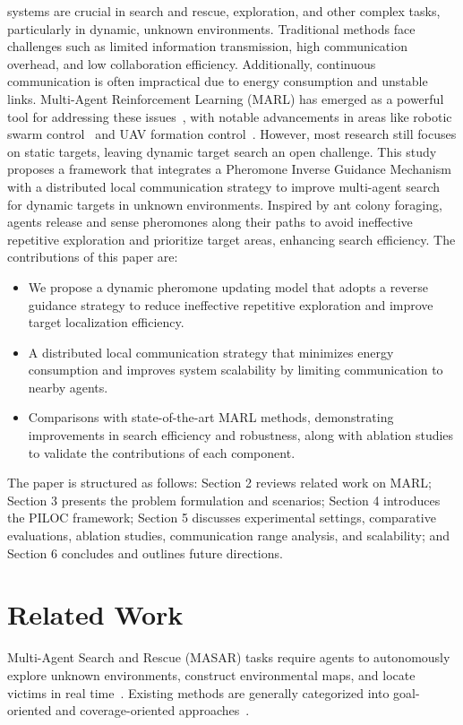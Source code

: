 \documentclass[lettersize,journal]{IEEEtran}
\begin{document}
 systems are crucial in search and rescue, exploration, and other complex tasks, particularly in dynamic, unknown environments. Traditional methods face challenges such as limited information transmission, high communication overhead, and low collaboration efficiency. Additionally, continuous communication is often impractical due to energy consumption and unstable links. Multi-Agent Reinforcement Learning (MARL) has emerged as a powerful tool for addressing these issues~\cite{bahrpeyma2022review,agrawal2021multi}, with notable advancements in areas like robotic swarm control~\cite{huang2020multi} and UAV formation control~\cite{yuling2023formation}. However, most research still focuses on static targets, leaving dynamic target search an open challenge.
This study proposes a framework that integrates a Pheromone Inverse Guidance Mechanism with a distributed local communication strategy to improve multi-agent search for dynamic targets in unknown environments. Inspired by ant colony foraging, agents release and sense pheromones along their paths to avoid ineffective repetitive exploration and prioritize target areas, enhancing search efficiency.
The contributions of this paper are:
\begin{itemize}
    \item We propose a dynamic pheromone updating model that adopts a reverse guidance strategy to reduce ineffective repetitive exploration and improve target localization efficiency.
    \item A distributed local communication strategy that minimizes energy consumption and improves system scalability by limiting communication to nearby agents.
    \item Comparisons with state-of-the-art MARL methods, demonstrating improvements in search efficiency and robustness, along with ablation studies to validate the contributions of each component.
\end{itemize}

The paper is structured as follows: Section 2 reviews related work on MARL; Section 3 presents the problem formulation and scenarios; Section 4 introduces the PILOC framework; Section 5 discusses experimental settings, comparative evaluations, ablation studies, communication range analysis, and scalability; and Section 6 concludes and outlines future directions.


\section{Related Work}
\IEEEpubidadjcol
Multi-Agent Search and Rescue (MASAR) tasks require agents to autonomously explore unknown environments, construct environmental maps, and locate victims in real time~\cite{niroui2019deep}. Existing methods are generally categorized into goal-oriented and coverage-oriented approaches~\cite{de2023hierarchical}.
\end{document}
